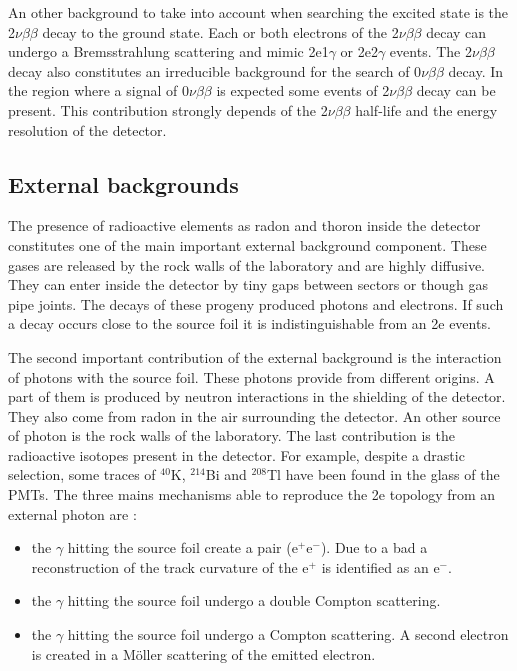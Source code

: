 \documentclass[main.tex]{subfiles}
\begin{document}
\NI An other background to take into account when searching the excited state is the 2$\nu\beta\beta$ decay to the ground state. Each or both electrons of the 2$\nu\beta\beta$ decay can undergo a Bremsstrahlung scattering and mimic 2e1$\gamma$ or 2e2$\gamma$ events. The 2$\nu\beta\beta$ decay also constitutes an irreducible background for the search of 0$\nu\beta\beta$ decay. In the region where a signal of 0$\nu\beta\beta$ is expected some events of 2$\nu\beta\beta$ decay can be present. This contribution strongly depends of the 2$\nu\beta\beta$ half-life and the energy resolution of the detector.


\FloatBarrier


\subsection{External backgrounds}\label{sec:externalBkg}


\NI The presence of radioactive elements as radon and thoron inside the detector constitutes one of the main important external background component. These gases are released by the rock walls of the laboratory and are highly diffusive. They can enter inside the detector by tiny gaps between sectors or though gas pipe joints. The decays of these progeny produced photons and electrons. If such a decay occurs close to the source foil it is indistinguishable from an 2e events.


\bigskip


\NI The second important contribution of the external background is the interaction of photons with the source foil. These photons provide from different origins. A part of them is produced by neutron interactions in the shielding of the detector. They also come from radon in the air surrounding the detector. An other source of photon is the rock walls of the laboratory. The last contribution is the radioactive isotopes present in the detector. For example, despite a drastic selection, some traces of $^{\text{40}}$K, $^{\text{214}}$Bi and $^{\text{208}}$Tl have been found in the glass of the PMTs. The three mains mechanisms able to reproduce the 2e topology from an external photon are :   


\begin{itemize}
\item the $\gamma$ hitting the source foil create a pair (e$^+$e$^-$). Due to a bad a reconstruction of the track curvature of the e$^+$ is identified as an e$^-$.
\item the $\gamma$ hitting the source foil undergo a double Compton scattering.
\item the $\gamma$ hitting the source foil undergo a Compton scattering. A second electron is created in a M\"oller scattering of the emitted electron.
\end{itemize} 
\end{document}

